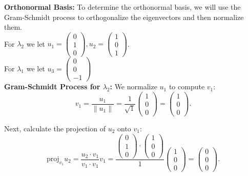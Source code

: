 \documentclass{article}
\theoremstyle{plain}
\numberwithin{thm}{section}
\theoremstyle{definition}
\begin{document}
\begin{enumerate}
    \textbf{Orthonormal Basis:} To determine the orthonormal basis, we will use the Gram-Schmidt process to orthogonalize the eigenvectors and then normalize them.\\
    For $\lambda_2$ we let $u_1=\begin{pmatrix} 0\\1\\0\end{pmatrix}, u_2=\begin{pmatrix} 1\\0\\1\end{pmatrix}$.\\
    For $\lambda_1$ we let $u_3 = \begin{pmatrix} 0 \\ 0 \\ -1 \end{pmatrix}$\\

    \textbf{Gram-Schmidt Process for $\lambda_2$:} We normalize $u_1$ to compute $v_1$:
    \[
    v_1 = \frac{u_1}{\|u_1\|} = \frac{1}{\sqrt{1}} \begin{pmatrix} 1 \\ 0 \\ 0 \end{pmatrix} = \begin{pmatrix} 1 \\ 0 \\ 0 \end{pmatrix}.
    \]
    
    Next, calculate the projection of $u_2$ onto $v_1$:
    \[
    \text{proj}_{v_1} u_2 = \frac{u_2 \cdot v_1}{v_1 \cdot v_1} v_1 = \frac{\begin{pmatrix} 0 \\ 1 \\ 0 \end{pmatrix} \cdot \begin{pmatrix} 1 \\ 0 \\ 0 \end{pmatrix}}{1} \begin{pmatrix} 1 \\ 0 \\ 0 \end{pmatrix} = \begin{pmatrix} 0 \\ 0 \\ 0 \end{pmatrix}.
    \]
    

\end{enumerate}
\end{document}
